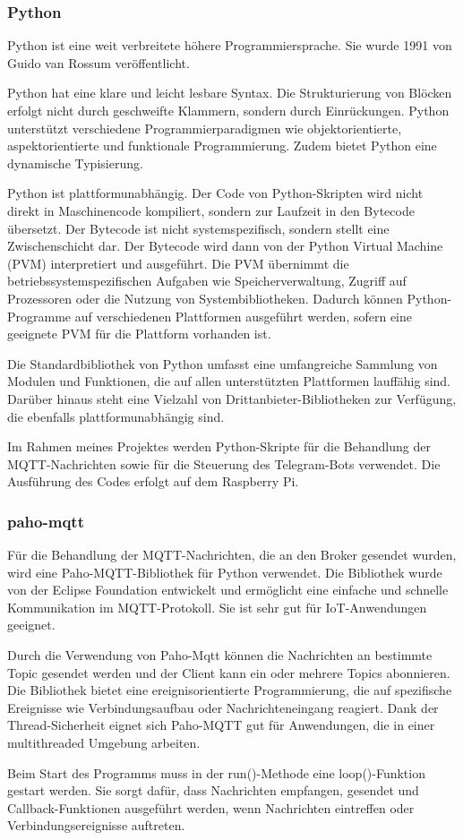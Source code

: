 \documentclass[12pt, letterpaper]{article}
\begin{document}
\subsubsection{Python}
\par Python ist eine weit verbreitete höhere Programmiersprache. Sie wurde 1991 von Guido van Rossum veröffentlicht.
\par Python hat eine klare und leicht lesbare Syntax. Die Strukturierung von Blöcken erfolgt nicht durch geschweifte Klammern, sondern durch Einrückungen. Python unterstützt verschiedene Programmierparadigmen wie objektorientierte, aspektorientierte und funktionale Programmierung. Zudem bietet Python eine dynamische Typisierung.
\par Python ist plattformunabhängig. Der Code von Python-Skripten wird nicht direkt in Maschinencode kompiliert, sondern zur Laufzeit in den Bytecode übersetzt. Der Bytecode ist nicht systemspezifisch, sondern stellt eine Zwischenschicht dar. Der Bytecode wird dann von der Python Virtual Machine (PVM) interpretiert und ausgeführt. Die PVM übernimmt die betriebssystemspezifischen Aufgaben wie Speicherverwaltung, Zugriff auf Prozessoren oder die Nutzung von Systembibliotheken. Dadurch können Python-Programme auf verschiedenen Plattformen ausgeführt werden, sofern eine geeignete PVM für die Plattform vorhanden ist.
\par Die Standardbibliothek von Python umfasst eine umfangreiche Sammlung von Modulen und Funktionen, die auf allen unterstützten Plattformen lauffähig sind. Darüber hinaus steht eine Vielzahl von Drittanbieter-Bibliotheken zur Verfügung, die ebenfalls plattformunabhängig sind. 
\par Im Rahmen meines Projektes werden Python-Skripte für die Behandlung der MQTT-Nachrichten sowie für die Steuerung des Telegram-Bots verwendet. Die Ausführung des Codes erfolgt auf dem Raspberry Pi.
\subsubsection{paho-mqtt}
\par Für die Behandlung der MQTT-Nachrichten, die an den Broker gesendet wurden, wird eine Paho-MQTT-Bibliothek für Python verwendet. Die Bibliothek wurde von der Eclipse Foundation entwickelt und ermöglicht eine einfache und schnelle Kommunikation im MQTT-Protokoll. Sie ist sehr gut für IoT-Anwendungen geeignet. 
\par Durch die Verwendung von Paho-Mqtt können die Nachrichten an bestimmte Topic gesendet werden und der Client kann ein oder mehrere Topics abonnieren. Die Bibliothek bietet eine ereignisorientierte Programmierung, die auf spezifische Ereignisse wie Verbindungsaufbau oder Nachrichteneingang reagiert. Dank der Thread-Sicherheit eignet sich Paho-MQTT gut für Anwendungen, die in einer multithreaded Umgebung arbeiten.
\par Beim Start des Programms muss in der run()-Methode eine loop()-Funktion gestart werden. Sie sorgt dafür, dass Nachrichten empfangen, gesendet und Callback-Funktionen ausgeführt werden, wenn Nachrichten eintreffen oder Verbindungsereignisse auftreten.
\end{document}
